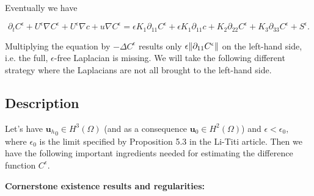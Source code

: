\documentclass[11pt]{article}
\begin{document}
Eventually we have

$$ \partial_t C^\epsilon + U^\epsilon \nabla C^\epsilon  + U^\epsilon \nabla c+ u \nabla C^\epsilon = \epsilon K_1 \partial_{11} C^\epsilon + \epsilon K_1 \partial_{11} c + K_2 \partial_{22} C^\epsilon + K_3 \partial_{33} C^\epsilon + S^\epsilon. $$

Multiplying the equation by $- \Delta C^\epsilon$ results only $\epsilon \norm{\partial_{11} C^\epsilon}$ on the left-hand side, i.e. the full, $\epsilon$-free Laplacian is missing. We will take the following different strategy where the Laplacians are not all brought to the left-hand side.

\subsection{Description}

Let's have ${\mathbf{u}_h}_0 \in H^3(\Omega)$ (and as a consequence $\mathbf{u}_0 \in H^2(\Omega)$) and $\epsilon < \epsilon_0,$ where $\epsilon_0$ is the limit specified by Proposition 5.3 in the Li-Titi article. Then we have the following important ingredients needed for estimating the difference function $C^\epsilon.$

\textbf{Cornerstone existence results and regularities:}
\end{document}
